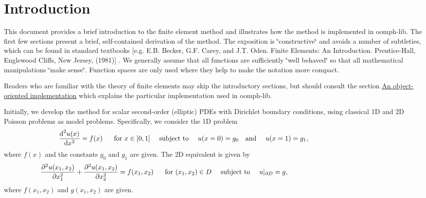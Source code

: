 \hypertarget{index_intro}{}\section{Introduction}\label{index_intro}
This document provides a brief introduction to the finite element method and illustrates how the method is implemented in {\ttfamily oomph-\/lib}. The first few sections present a brief, self-\/contained derivation of the method. The exposition is \char`\"{}constructive\char`\"{} and avoids a number of subtleties, which can be found in standard textbooks \mbox{[}e.\+g. E.\+B. Becker, G.\+F. Carey, and J.\+T. Oden. Finite Elements\+: An Introduction. Prentice-\/\+Hall, Englewood Cliffs, New Jersey, (1981)\mbox{]} . We generally assume that all functions are sufficiently \char`\"{}well behaved\char`\"{} so that all mathematical manipulations \char`\"{}make sense\char`\"{}. Function spaces are only used where they help to make the notation more compact.

Readers who are familiar with the theory of finite elements may skip the introductory sections, but should consult the section \hyperlink{index_towards_oo}{An object-\/oriented implementation} which explains the particular implementation used in {\ttfamily oomph-\/lib}.

Initially, we develop the method for scalar second-\/order (elliptic) P\+D\+Es with Dirichlet boundary conditions, using classical 1D and 2D Poisson problems as model problems. Specifically, we consider the 1D problem \[ \frac{\mbox{d}^2 u(x)}{\mbox{d} x^2} = f(x) \mbox{ \ \ \ \ for $x\in[0,1]$ \ \ \ subject to \ \ \ } u(x=0)= g_0 \mbox{\ \ \ and \ \ \ } u(x=1)= g_1, \mbox{\hspace{3cm}} \] where $ f(x)$ and the constants $g_0$ and $g_1$ are given. The 2D equivalent is given by \[ \frac{\partial^2 u(x_1,x_2)}{\partial x_1^{2}} + \frac{\partial^{2} u(x_1,x_2)}{\partial x_2^{2}} = f(x_1,x_2) \mbox{ \ \ \ \ for $(x_1,x_2)\in D$ \ \ \ subject to \ \ \ } u|_{\partial D} = g, \mbox{\hspace{5cm}} \] where $ f(x_1,x_2)$ and $ g(x_1,x_2)$ are given.

